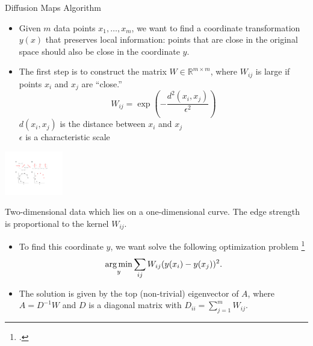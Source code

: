 \documentclass[10pt]{beamer}
\begin{document}
\begin{frame}{Diffusion Maps Algorithm}

\begin{minipage}{0.7\textwidth}

\begin{itemize}

\item Given $m$ data points $x_1, \dots, x_m$, we want to find a coordinate transformation $y(x)$ that preserves local information: points that are close in the original space should also be close in the coordinate $y$.

\item The first step is to construct the matrix $W \in \mathbb{R}^{m \times m}$, where $W_{ij}$ is large if points $x_i$ and $x_j$ are ``close.''
$$W_{ij} = \exp \left( -\frac{d^2(x_i, x_j)}{\epsilon^2} \right)$$
$d(x_i, x_j)$ is the distance between $x_i$ and $x_j$\\
$\epsilon$ is a characteristic scale

\end{itemize}
\end{minipage}
\begin{minipage}{0.28\textwidth}
\centering
\includegraphics[width=1in]{dmaps_edges}

{\scriptsize Two-dimensional data which lies on a one-dimensional curve. The edge strength is proportional to the kernel $W_{ij}$. \par}
\end{minipage}

\begin{itemize}
\item To find this coordinate $y$, we want solve the following optimization problem \footcite{Belkin2003}
$$\operatorname*{arg\,min}_{y} \sum_{ij} W_{ij} (y(x_i) - y(x_j))^2.$$
%
\item The solution is given by the top (non-trivial) eigenvector of $A$, where $A=D^{-1} W$ and $D$ is a diagonal matrix with $D_{ii} = \sum_{j=1}^{m} W_{ij}$.
%
%
\end{itemize}

\end{frame}
\end{document}
